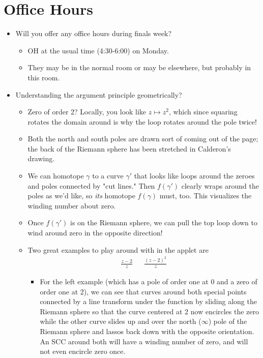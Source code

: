 \documentclass[../notes.tex]{subfiles}
\begin{document}
\section{Office Hours}
\begin{itemize}
    \item Will you offer any office hours during finals week?
    \begin{itemize}
        \item OH at the usual time (4:30-6:00) on Monday.
        \item They may be in the normal room or may be elsewhere, but probably in this room.
    \end{itemize}
    \item Understanding the argument principle geometrically?
    \begin{itemize}
        \item Zero of order 2? Locally, you look like $z\mapsto z^2$, which since squaring rotates the domain around is why the loop rotates around the pole twice!
        \item Both the north and south poles are drawn sort of coming out of the page; the back of the Riemann sphere has been stretched in Calderon's drawing.
        \item We can homotope $\gamma$ to a curve $\gamma'$ that looks like loops around the zeroes and poles connected by "cut lines." Then $f(\gamma')$ clearly wraps around the poles as we'd like, so \emph{its} homotope $f(\gamma)$ must, too. This visualizes the winding number about zero.
        \item Once $f(\gamma')$ is on the Riemann sphere, we can pull the top loop down to wind around zero in the opposite direction!
        \item Two great examples to play around with in the applet are
        \begin{align*}
            \frac{z-2}{z}&&
            \frac{(z-2)^2}{z}
        \end{align*}
        \begin{itemize}
            \item For the left example (which has a pole of order one at 0 and a zero of order one at 2), we can see that curves around both special points connected by a line transform under the function by sliding along the Riemann sphere so that the curve centered at 2 now encircles the zero while the other curve slides up and over the north ($\infty$) pole of the Riemann sphere and lassos back down with the opposite orientation. An SCC around both will have a winding number of zero, and will not even encircle zero once.

\end{itemize}
\end{itemize}
\end{itemize}
\end{document}
